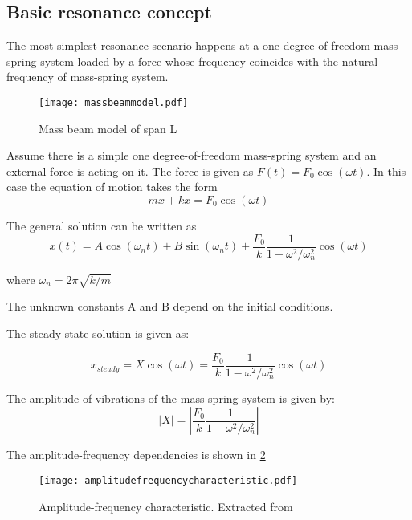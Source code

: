 \subsection{Basic resonance concept}
The most simplest resonance scenario happens at a one degree-of-freedom mass-spring system loaded by a force whose frequency coincides with the natural frequency of mass-spring system.
\begin{figure}[h]
	\centering
	\texttt{[image: massbeammodel.pdf]}
	\caption{Mass beam model of span L}
	\label{fig:massbeammodel}
\end{figure}

Assume there is a simple one degree-of-freedom mass-spring system and an external force is acting on it. The force is given as $F(t)= F_0 \cos(\omega t)$. In this case the equation of motion takes the form
\begin{equation}
	m\ddot{x} + kx = F_0 \cos(\omega t)
\end{equation}

The general solution can be written as
\begin{equation}
	x(t) = A\cos(\omega_n t)+B\sin(\omega_n t) +\frac{F_0}{k}\frac{1}{1-\omega^2/\omega_n^2}\cos(\omega t)
\end{equation}

where $\omega_n = 2\pi\sqrt{k/m}$

The unknown constants A and B depend on the initial conditions.

The steady-state solution is given as:

\begin{equation}
	x_{steady}= X \cos(\omega t) = \frac{F_0}{k}\frac{1}{1-\omega^2/\omega_n^2}\cos(\omega t)
\end{equation}

The amplitude of vibrations of the mass-spring system is given by:
\begin{equation}
	|X|=|\frac{F_0}{k}\frac{1}{1-\omega^2/\omega_n^2}|
\end{equation}

The amplitude-frequency dependencies is shown in \ref{fig:amplitude-frequency-characteristic} 

\begin{figure}[h]
	\centering
	\texttt{[image: amplitudefrequencycharacteristic.pdf]}
	\caption{Amplitude-frequency characteristic. Extracted from \cite[2.2.2]{dynamicslecturenote}}
	\label{fig:amplitude-frequency-characteristic}
\end{figure}

